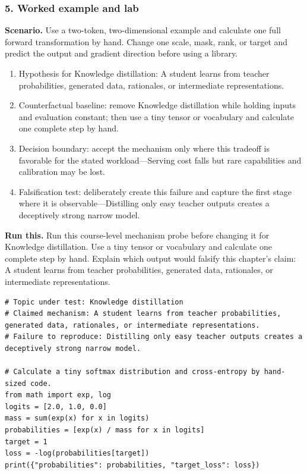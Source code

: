 \subsubsection*{5. Worked example and lab}
\textbf{Scenario.} Use a two-token, two-dimensional example and calculate one full forward transformation by hand. Change one scale, mask, rank, or target and predict the output and gradient direction before using a library.
\begin{enumerate}
\item Hypothesis for Knowledge distillation: A student learns from teacher probabilities, generated data, rationales, or intermediate representations.
\item Counterfactual baseline: remove Knowledge distillation while holding inputs and evaluation constant; then use a tiny tensor or vocabulary and calculate one complete step by hand.
\item Decision boundary: accept the mechanism only where this tradeoff is favorable for the stated workload—Serving cost falls but rare capabilities and calibration may be lost.
\item Falsification test: deliberately create this failure and capture the first stage where it is observable—Distilling only easy teacher outputs creates a deceptively strong narrow model.
\end{enumerate}
\textbf{Run this.} Run this course-level mechanism probe before changing it for Knowledge distillation. Use a tiny tensor or vocabulary and calculate one complete step by hand. Explain which output would falsify this chapter's claim: A student learns from teacher probabilities, generated data, rationales, or intermediate representations.
\begin{Verbatim}[fontsize=\scriptsize]
# Topic under test: Knowledge distillation
# Claimed mechanism: A student learns from teacher probabilities, generated data, rationales, or intermediate representations.
# Failure to reproduce: Distilling only easy teacher outputs creates a deceptively strong narrow model.

# Calculate a tiny softmax distribution and cross-entropy by hand-sized code.
from math import exp, log
logits = [2.0, 1.0, 0.0]
mass = sum(exp(x) for x in logits)
probabilities = [exp(x) / mass for x in logits]
target = 1
loss = -log(probabilities[target])
print({"probabilities": probabilities, "target_loss": loss})
\end{Verbatim}
